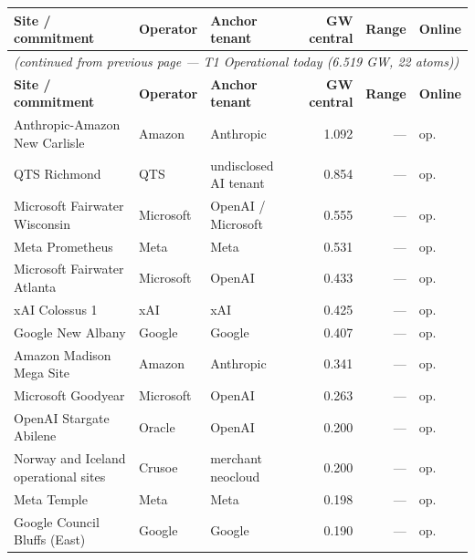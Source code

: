 \documentclass[11pt,a4paper]{article}
\begin{document}
\noindent\begin{small}
\begin{longtable}{@{}p{4.5cm} p{2.4cm} p{2.4cm} r r p{1.8cm}@{}}
\toprule
\textbf{Site / commitment} & \textbf{Operator} & \textbf{Anchor tenant} & \textbf{GW central} & \textbf{Range} & \textbf{Online} \\
\midrule
\endfirsthead
\multicolumn{6}{l}{\textit{(continued from previous page — T1 Operational today (6.519 GW, 22 atoms))}} \\
\toprule
\textbf{Site / commitment} & \textbf{Operator} & \textbf{Anchor tenant} & \textbf{GW central} & \textbf{Range} & \textbf{Online} \\
\midrule
\endhead
\bottomrule
\endfoot

Anthropic-Amazon New Carlisle & Amazon & Anthropic & 1.092 & — & op. \\

QTS Richmond & QTS & undisclosed AI tenant & 0.854 & — & op. \\

Microsoft Fairwater Wisconsin & Microsoft & OpenAI / Microsoft & 0.555 & — & op. \\

Meta Prometheus & Meta & Meta & 0.531 & — & op. \\

Microsoft Fairwater Atlanta & Microsoft & OpenAI & 0.433 & — & op. \\

xAI Colossus 1 & xAI & xAI & 0.425 & — & op. \\

Google New Albany & Google & Google & 0.407 & — & op. \\

Amazon Madison Mega Site & Amazon & Anthropic & 0.341 & — & op. \\

Microsoft Goodyear & Microsoft & OpenAI & 0.263 & — & op. \\

OpenAI Stargate Abilene & Oracle & OpenAI & 0.200 & — & op. \\

Norway and Iceland operational sites & Crusoe & merchant neocloud & 0.200 & — & op. \\

Meta Temple & Meta & Meta & 0.198 & — & op. \\

Google Council Bluffs (East) & Google & Google & 0.190 & — & op. \\


\end{longtable}
\end{small}
\end{document}
